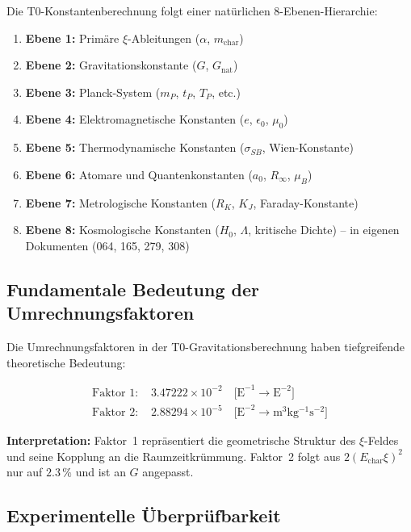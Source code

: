 	Die T0-Konstantenberechnung folgt einer natürlichen 8-Ebenen-Hierarchie:
	
	\begin{enumerate}
		\item \textbf{Ebene 1:} Primäre $\xi$-Ableitungen ($\alpha$, $m_{\text{char}}$)
		\item \textbf{Ebene 2:} Gravitationskonstante ($G$, $G_{\text{nat}}$)
		\item \textbf{Ebene 3:} Planck-System ($m_P$, $t_P$, $T_P$, etc.)
		\item \textbf{Ebene 4:} Elektromagnetische Konstanten ($e$, $\epsilon_0$, $\mu_0$)
		\item \textbf{Ebene 5:} Thermodynamische Konstanten ($\sigma_{SB}$, Wien-Konstante)
		\item \textbf{Ebene 6:} Atomare und Quantenkonstanten ($a_0$, $R_\infty$, $\mu_B$)
		\item \textbf{Ebene 7:} Metrologische Konstanten ($R_K$, $K_J$, Faraday-Konstante)
		\item \textbf{Ebene 8:} Kosmologische Konstanten ($H_0$, $\Lambda$, kritische Dichte) -- in eigenen Dokumenten (064, 165, 279, 308)
	\end{enumerate}
	
	\subsection{Fundamentale Bedeutung der Umrechnungsfaktoren}
	
	Die Umrechnungsfaktoren in der T0-Gravitationsberechnung haben tiefgreifende theoretische Bedeutung:
	
	\begin{align}
		\text{Faktor 1: } &3.47222 \times 10^{-2} \quad \text{[E}^{-1} \rightarrow \text{E}^{-2}\text{]} \\
		\text{Faktor 2: } &2.88294 \times 10^{-5} \quad \text{[E}^{-2} \rightarrow \si{\meter^3 \kilogram^{-1} \second^{-2}}\text{]}
	\end{align}
	
	\textbf{Interpretation:} Faktor~1 repräsentiert die geometrische Struktur des $\xi$-Feldes und seine Kopplung an die Raumzeitkrümmung. Faktor~2 folgt aus $2(E_{\text{char}}\xi)^2$ nur auf $2.3\,\%$ und ist an $G$ angepasst.
	
	\subsection{Experimentelle Überprüfbarkeit}
	
